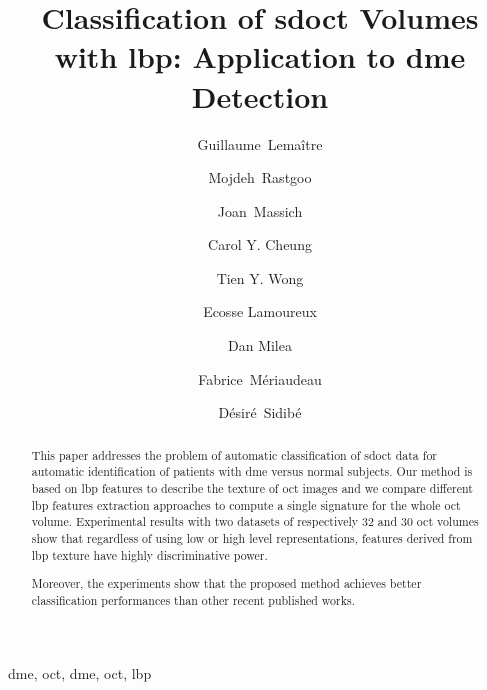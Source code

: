 \title{Classification of \acs*{sdoct} Volumes with \acs*{lbp}: Application to \acs*{dme} Detection}


\author[le2i,vicorob]{Guillaume~Lema\^itre}
\author[le2i,vicorob]{Mojdeh~Rastgoo}
\author[le2i]{Joan~Massich}
\author[seri]{Carol Y. Cheung}
\author[seri]{Tien Y. Wong}
\author[seri]{Ecosse Lamoureux}
\author[seri]{Dan Milea}
\author[le2i]{Fabrice~M\'eriaudeau}
\author[le2i]{D\'esir\'e~Sidib\'e}

\address[le2i]{ViCOROB, Universitat de Girona, Campus Montilivi, Edifici P4, 17071 Girona, Spain}
\address[vicorob]{LE2I UMR6306, CNRS, Arts et M\'etiers, Univ. Bourgogne Franche-Comt\'e, 12 rue de la Fonderie, 71200 Le Creusot, France}
\address[seri]{Singaore Eye Research Institute, Singapore National Eye Center, Singapore}
\begin{abstract}
\acresetall  %
This paper addresses the problem of automatic classification of \ac{sdoct} data for automatic identification of patients with \ac{dme} versus normal subjects.
Our method is based on \ac{lbp} features to describe the texture of \ac{oct} images and we compare different \ac{lbp} features extraction approaches to compute a single signature for the whole \ac{oct} volume.
Experimental results with two datasets of respectively 32 and 30 \ac{oct} volumes show that
regardless of using low or high level representations, features derived from \ac{lbp} texture have highly discriminative power.%

Moreover, the experiments show that the proposed method achieves better classification performances than other recent published works.
\end{abstract}

\begin{keyword}
\acl{dme}, \acl{oct}, \acs{dme}, \acs{oct}, \ac{lbp}
\end{keyword}
